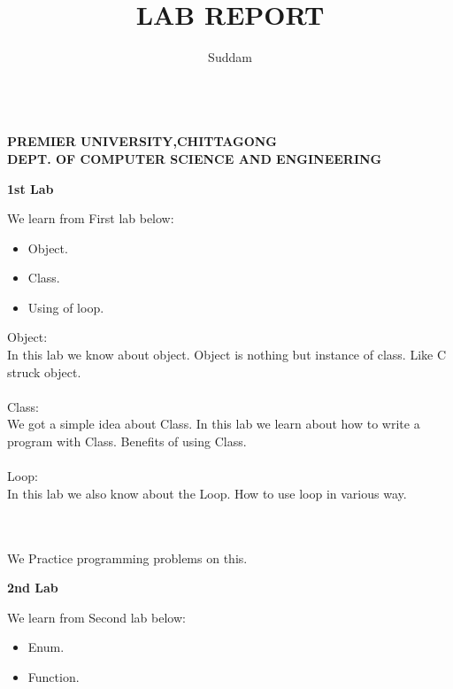 \documentclass[12pt]{article}
\title{LAB REPORT}
\author{Suddam}
\begin{document}
\textbf{\bigskip \bigskip \bigskip \bigskip}
\begin{Large}
\begin{center}
\textbf{\\ \bigskip PREMIER UNIVERSITY,CHITTAGONG } \\
\textbf{DEPT. OF COMPUTER SCIENCE AND ENGINEERING}\\
\end{center}
\end{Large}
\maketitle
\newpage
 \begin{center}
   \textbf{1st Lab} \\
 \end{center} 
 We learn from First lab below: 
 \begin{itemize} 
 \item Object. \item Class. \item Using of loop.
 \end{itemize}
  Object:\\ 
  {In this lab we know about object. Object is nothing but instance of class. Like C struck object. } \\ \\
   {Class: \\ 
   We got a simple idea about Class. In this lab we learn about how to write a program with Class. Benefits of using Class.} \\ \\
    {Loop:\\
     In this lab we also know about the Loop. How to use loop in various way. } \\ \\ \\
      \begin{large}
       We Practice programming problems on this. \\ 
       \end{large} 
       \begin{center}
        \textbf{2nd Lab} \\
         \end{center}
          We learn from Second lab below:
           \begin{itemize}
            \item Enum. \item Function. 
            \end{itemize}
\end{document}
